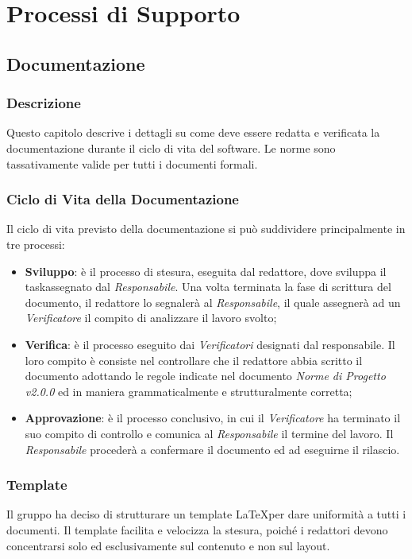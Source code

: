 \section{Processi di Supporto}\label{ProcessiSupporto}

\subsection{Documentazione}\label{ProcessiSupporto_Documentazione}

\subsubsection{Descrizione}
Questo capitolo descrive i dettagli su come deve essere redatta e verificata la documentazione durante il ciclo di vita del software. Le norme sono tassativamente valide per tutti i documenti formali.
\subsubsection{Ciclo di Vita della Documentazione}
Il ciclo di vita previsto della documentazione si può suddividere principalmente in tre processi: 
\begin{itemize}
	\item \textbf{Sviluppo}: è il processo di stesura, eseguita dal redattore, dove sviluppa il task\glossario assegnato dal \textit{Responsabile}. Una volta terminata la fase di scrittura del documento, il redattore lo segnalerà al \textit{Responsabile}, il quale assegnerà ad un \textit{Verificatore} il compito di analizzare il lavoro svolto;
 	\item \textbf{Verifica}: è il processo eseguito dai \textit{Verificatori} designati dal responsabile. Il loro compito è consiste nel controllare che il redattore abbia scritto il documento adottando le regole indicate nel documento \textit{Norme di Progetto v2.0.0} ed in maniera grammaticalmente e strutturalmente corretta;
 	\item \textbf{Approvazione}: è il processo conclusivo, in cui il \textit{Verificatore} ha terminato il suo compito di controllo e comunica al \textit{Responsabile} il termine del lavoro. Il \textit{Responsabile} procederà a confermare il documento ed ad eseguirne il rilascio.
\end{itemize} 

\subsubsection{Template}
Il gruppo ha deciso di strutturare un template \LaTeX  per dare uniformità a tutti i documenti. Il template facilita e velocizza la stesura, poiché i redattori devono concentrarsi solo ed esclusivamente sul contenuto e non sul layout.  

